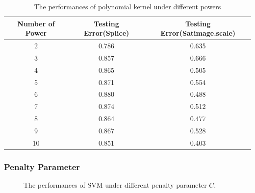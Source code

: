 \documentclass[12pt,a4paper]{article}
\theoremstyle{definition}
\begin{document}
\begin{table}[H]
	\renewcommand\arraystretch{1.35}
	\caption{The performances of polynomial kernel under different powers}
	\label{tab:kernel-poly}
	\centering
	
	\begin{tabular}{c|c|c}
		\centering
		Number of Power & Testing Error(Splice) & Testing Error(Satimage.scale) \\
		\hline
		
		2 & 0.786 & 0.635 \\
		3 & 0.857 & 0.666 \\
		4 & 0.865 & 0.505 \\
		5 & 0.871 & 0.554 \\
		6 & 0.880 & 0.488 \\
		7 & 0.874 & 0.512 \\
		8 & 0.864 & 0.477 \\
		9 & 0.867 & 0.528 \\
		10 & 0.851 & 0.403 \\
	\end{tabular}
\end{table}

\subsubsection{Penalty Parameter}

\begin{figure}[H]
	\centering
	\caption{The performances of SVM under different penalty parameter $C$.}
	\label{fig:svm-penalty}
\end{figure}
\end{document}
